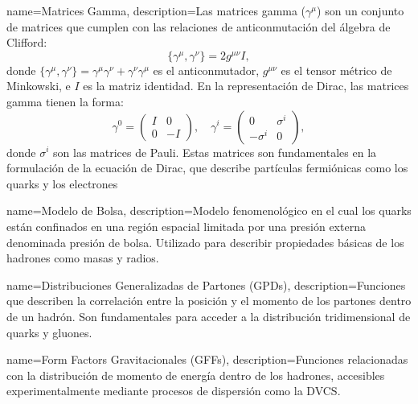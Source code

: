 {
    name=Matrices Gamma,
    description={Las matrices gamma (\( \gamma^\mu \)) son un conjunto de matrices que cumplen con las relaciones de anticonmutación del álgebra de Clifford:
    \[
        \{ \gamma^\mu, \gamma^\nu \} = 2 g^{\mu \nu} I,
    \]
    donde \( \{ \gamma^\mu, \gamma^\nu \} = \gamma^\mu \gamma^\nu + \gamma^\nu \gamma^\mu \) es el anticonmutador, \( g^{\mu \nu} \) es el tensor métrico de Minkowski, e \( I \) es la matriz identidad. En la representación de Dirac, las matrices gamma tienen la forma:
    \[
        \gamma^0 = \begin{pmatrix}
            I & 0 \\
            0 & -I
        \end{pmatrix}, \quad
        \gamma^i = \begin{pmatrix}
            0 & \sigma^i \\
            -\sigma^i & 0
        \end{pmatrix},
    \]
    donde \( \sigma^i \) son las matrices de Pauli. Estas matrices son fundamentales en la formulación de la ecuación de Dirac, que describe partículas fermiónicas como los quarks y los electrones}
}

{
    name=Modelo de Bolsa,
    description={Modelo fenomenológico en el cual los quarks están confinados en una región espacial limitada por una presión externa denominada presión de bolsa. Utilizado para describir propiedades básicas de los hadrones como masas y radios.}
}

{
    name=Distribuciones Generalizadas de Partones (GPDs),
    description={Funciones que describen la correlación entre la posición y el momento de los partones dentro de un hadrón. Son fundamentales para acceder a la distribución tridimensional de quarks y gluones.}
}

{
    name=Form Factors Gravitacionales (GFFs),
    description={Funciones relacionadas con la distribución de momento de energía dentro de los hadrones, accesibles experimentalmente mediante procesos de dispersión como la DVCS.}
}